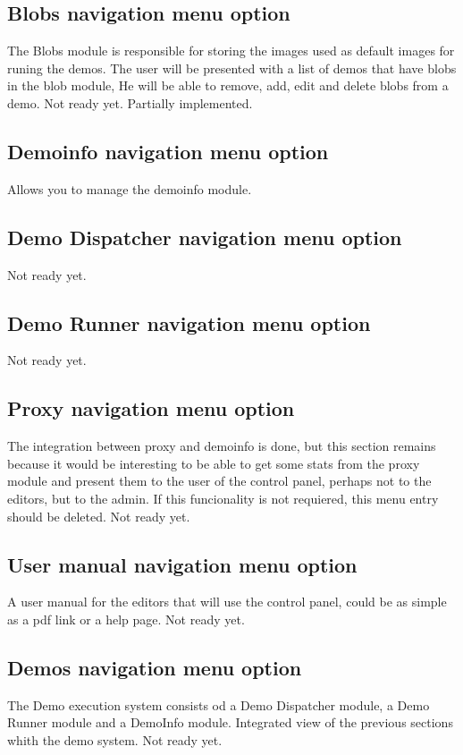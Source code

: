 \subsection{Blobs navigation menu option}
The Blobs module is responsible for storing the images used as default images for runing the demos.
The user will be presented with a list of demos that have blobs in the blob module,
He will be able to remove, add, edit and delete blobs from a demo.
Not ready yet. Partially implemented.

\subsection{Demoinfo navigation menu option}
Allows you to manage the demoinfo module.


\subsection{Demo Dispatcher navigation menu option}
Not ready yet.

\subsection{Demo Runner navigation menu option}
Not ready yet.

\subsection{Proxy navigation menu option}
The integration between proxy and demoinfo is done, but this section remains because it would be interesting to be able to get some stats from the proxy module and present them to the user of the control panel, perhaps not to the editors, but to the admin.
If this funcionality is not requiered, this menu entry should be deleted.
Not ready yet.

\subsection{User manual navigation menu option}
A user manual for the editors that will use the control panel, could be as simple as a pdf link or a help page.
Not ready yet.

\subsection{Demos navigation menu option}
The Demo execution system consists od a Demo Dispatcher module, a Demo Runner module and a DemoInfo module.
Integrated view of the previous sections whith the demo system.
Not ready yet.

